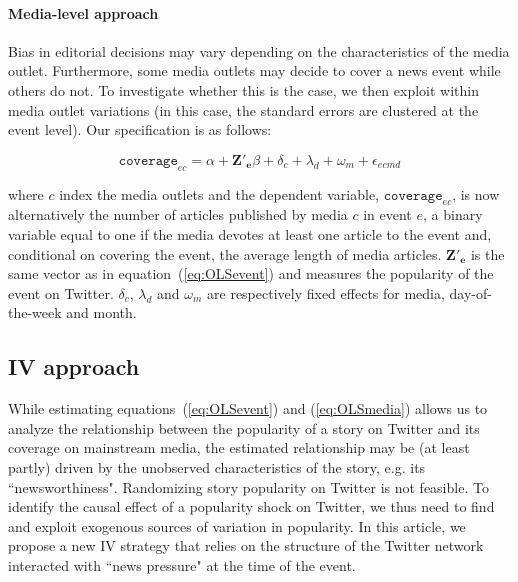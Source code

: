 \paragraph{Media-level approach}

Bias in editorial decisions may vary depending on the characteristics of the media outlet. Furthermore, some media outlets may decide to cover a news event while others do not. To investigate whether this is the case, we then exploit within media outlet variations (in this case, the standard errors are clustered at the event level). Our specification is as follows: 

\begin{equation}
\mathtt{coverage}_{ec}= \alpha + \mathbf{Z'_{e}}\beta +  \delta_{c}  + \lambda_d + \omega_m +\epsilon_{ecmd}
\label{eq:OLSmedia}
\end{equation}

\noindent where $c$ index the media outlets and the dependent variable, $\mathtt{coverage}_{ec}$, is now alternatively the number of articles published by media $c$ in event $e$, a binary variable equal to one if the media devotes at least one article to the event and, conditional on covering the event, the average length of media articles. $\mathbf{Z'_{e}}$ is the same vector as in equation~(\ref{eq:OLSevent}) and measures the popularity of the event on Twitter. $\delta_{c}$,  $\lambda_d$ and $\omega_m$ are respectively fixed effects for media, day-of-the-week and month.



\subsection{IV approach\label{Sec:SpecificationIV}}

While estimating equations~(\ref{eq:OLSevent}) and (\ref{eq:OLSmedia}) allows us to analyze the relationship between the popularity of a story on Twitter and its coverage on mainstream media, the estimated relationship may be (at least partly) driven by the unobserved characteristics of the story, e.g. its ``newsworthiness". Randomizing story popularity on Twitter is not feasible. To identify the causal effect of a popularity shock on Twitter, we thus need to find and exploit exogenous sources of variation in popularity. In this article, we propose a new IV strategy that relies on the structure of the Twitter network interacted with ``news pressure" at the time of the event.

